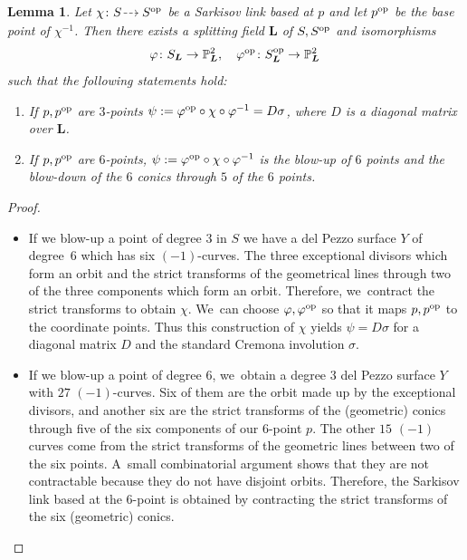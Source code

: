 \documentclass[JEP,XML,SOM,Unicode,NoFloatCountersInSection, NoEqCountersInSection,published]{cedram}
\newcommand{\dradpl}{{\hspace*{-2mm}\begin{tikzcd}[ampersand replacement=\&,column sep = scriptsize]\mbox{}\ar[r,dashed]\&\mbox{}\end{tikzcd}\hspace*{-2mm}}}
\newcommand{\dratst}{{\hspace*{-2.5mm}\begin{tikzcd}[ampersand replacement=\&,column sep = small]\mbox{}\ar[r,dashed]\&\mbox{}\end{tikzcd}\hspace*{-2mm}}}
\let\drascst\dratst
\newcommand{\dra}{\mathchoice{\dradpl}{\dratst}{\drascst}{\drascst}}
\newcommand{\op}{\textup{op}}
\newtheorem{lemma}[theorem]{Lemma}
\theoremstyle{definition}
\newcommand{\LL}{{\boldsymbol{L}}}
\begin{document}
\begin{lemma} \label{BaseP}
Let $\chi\colon S \dra S^{\op}$ be a Sarkisov link based at $p$ and let $p^{\op}$ be the base point of $\chi^{-1}$. Then there exists a splitting field $\LL$ of $S,S^{\op}$ and isomorphisms
\[
\varphi\colon S_{\LL} \to \mathbb{P}^2_{\LL}, \quad \varphi^{\op}\colon S_{\LL}^{\op} \to \mathbb{P}^2_{\LL}
\]
such that the following statements hold:
\begin{enumerate}
\item \label{case: 1bp} If $p,p^{\op}$ are $3$\nobreakdash-points $\psi := \varphi^{\op} \circ \chi \circ \varphi^{-1} = D\sigma$, where $D$ is a diagonal matrix over $\LL$.
\item \label{case: 2bp} If $p,p^{\op}$ are $6$\nobreakdash-points, $\psi := \varphi^{\op} \circ \chi \circ \varphi^{-1}$ is the blow-up of $6$ points and the blow-down of the $6$ conics through $5$ of the $6$ points.
\end{enumerate}
\end{lemma}

\skpt
\begin{proof}
\begin{itemize}
\item If we blow-up a point of degree $3$ in $S$ we have a del Pezzo surface $Y$ of degree~$6$ which has six $(-1)$-curves. The three exceptional divisors which form an orbit and the strict transforms of the geometrical lines through two of the three components which form an orbit. Therefore, we~contract the strict transforms to obtain $\chi$. We~can choose $\varphi, \varphi^{\op}$ so that it maps $p,p^{\op}$ to the coordinate points. Thus this construction of $\chi$ yields $\psi = D \sigma$ for a diagonal matrix $D$ and the standard Cremona involution $\sigma$.
\item If we blow-up a point of degree $6$, we~obtain a degree $3$ del Pezzo surface $Y$ with $27$ $(-1)$-curves. Six of them are the orbit made up by the exceptional divisors, and another six are the strict transforms of the (geometric) conics through five of the six components of our $6$\nobreakdash-point $p$. The other $15$ $(-1)$ curves come from the strict transforms of the geometric lines between two of the six points. A~small combinatorial argument shows that they are not contractable because they do not have disjoint orbits. Therefore, the Sarkisov link based at the $6$\nobreakdash-point is obtained by contracting the strict transforms of the six (geometric) conics.
\end{itemize}
\end{proof}
\end{document}
